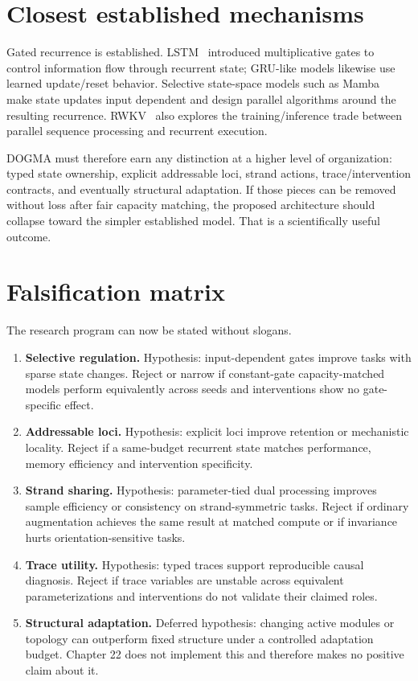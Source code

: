 
\section{Closest established mechanisms}

Gated recurrence is established. LSTM~\cite{lstm} introduced multiplicative gates to control
information flow through recurrent state; GRU-like models likewise use learned
update/reset behavior. Selective state-space models such as Mamba~\cite{mamba} make state updates
input dependent and design parallel algorithms around the resulting recurrence.
RWKV~\cite{rwkv} also explores the training/inference trade between parallel sequence processing
and recurrent execution.

DOGMA must therefore earn any distinction at a higher level of organization:
typed state ownership, explicit addressable loci, strand actions, trace/intervention
contracts, and eventually structural adaptation. If those pieces can be removed
without loss after fair capacity matching, the proposed architecture should collapse
toward the simpler established model. That is a scientifically useful outcome.

\section{Falsification matrix}

The research program can now be stated without slogans.

\begin{enumerate}
\item \textbf{Selective regulation.} Hypothesis: input-dependent gates improve tasks
with sparse state changes. Reject or narrow if constant-gate capacity-matched models
perform equivalently across seeds and interventions show no gate-specific effect.
\item \textbf{Addressable loci.} Hypothesis: explicit loci improve retention or
mechanistic locality. Reject if a same-budget recurrent state matches performance,
memory efficiency and intervention specificity.
\item \textbf{Strand sharing.} Hypothesis: parameter-tied dual processing improves
sample efficiency or consistency on strand-symmetric tasks. Reject if ordinary
augmentation achieves the same result at matched compute or if invariance hurts
orientation-sensitive tasks.
\item \textbf{Trace utility.} Hypothesis: typed traces support reproducible causal
diagnosis. Reject if trace variables are unstable across equivalent parameterizations
and interventions do not validate their claimed roles.
\item \textbf{Structural adaptation.} Deferred hypothesis: changing active modules
or topology can outperform fixed structure under a controlled adaptation budget.
Chapter 22 does not implement this and therefore makes no positive claim about it.
\end{enumerate}

